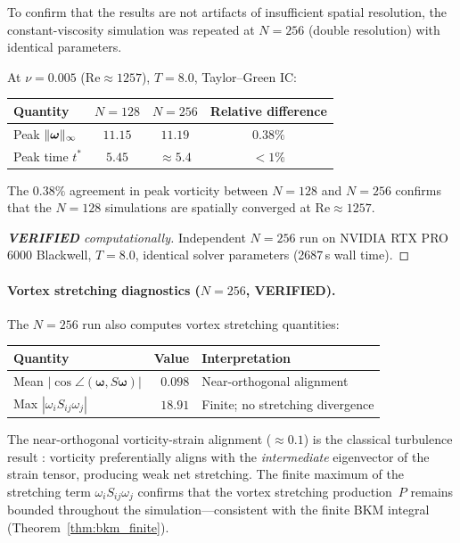 To confirm that the results are not artifacts of insufficient
spatial resolution, the constant-viscosity simulation was
repeated at $N=256$ (double resolution) with identical parameters.

\begin{theorem}\label{thm:resolution}
At $\nu = 0.005$ ($\mathrm{Re}\approx 1257$), $T = 8.0$,
Taylor--Green IC:
\begin{center}
\begin{tabular}{@{}lccc@{}}
\toprule
Quantity & $N=128$ & $N=256$ & Relative difference \\
\midrule
Peak $\lVert \bm{\omega} \rVert_\infty$ & $11.15$ & $11.19$ & $0.38\%$ \\
Peak time $t^*$ & $5.45$ & $\approx 5.4$ & $< 1\%$ \\
\bottomrule
\end{tabular}
\end{center}
The $0.38\%$ agreement in peak vorticity between $N=128$ and
$N=256$ confirms that the $N=128$ simulations are spatially
converged at $\mathrm{Re}\approx 1257$.
\end{theorem}

\begin{proof}[\textbf{VERIFIED} computationally]
Independent $N=256$ run on NVIDIA RTX PRO 6000 Blackwell,
$T=8.0$, identical solver parameters (2687\,s wall time).
\end{proof}

\paragraph{Vortex stretching diagnostics ($N=256$, VERIFIED).}
The $N=256$ run also computes vortex stretching quantities:
\begin{center}
\begin{tabular}{@{}lrl@{}}
\toprule
Quantity & Value & Interpretation \\
\midrule
Mean $|\cos\angle(\bm{\omega}, S\bm{\omega})|$ & $0.098$
  & Near-orthogonal alignment \\
Max $|\omega_i S_{ij} \omega_j|$ & $18.91$
  & Finite; no stretching divergence \\
\bottomrule
\end{tabular}
\end{center}
The near-orthogonal vorticity-strain alignment ($\approx 0.1$)
is the classical turbulence result \cite{ashurst1987}: vorticity
preferentially aligns with the \emph{intermediate} eigenvector of
the strain tensor, producing weak net stretching.  The finite
maximum of the stretching term $\omega_i S_{ij}\omega_j$ confirms
that the vortex stretching production~$P$ remains bounded
throughout the simulation---consistent with the finite BKM
integral (Theorem~\ref{thm:bkm_finite}).

